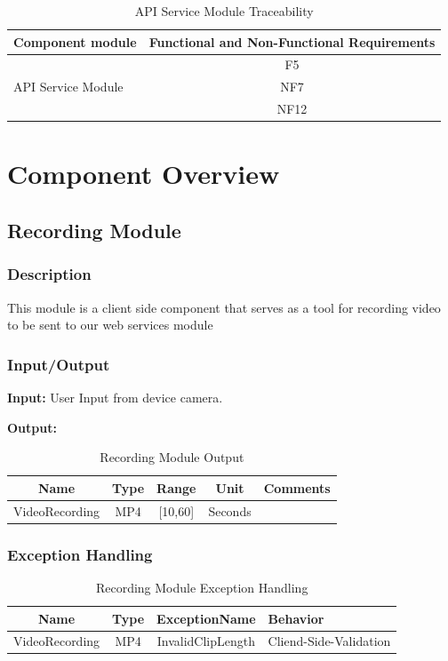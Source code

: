 \documentclass{article}
\begin{document}
\begin{table}[H]
    \caption{API Service Module Traceability}
    \centering
    \begin{tabular}{|l|c|} \hline
        \textbf{Component module} & \textbf{Functional and Non-Functional Requirements} \\ \hline
         \multirow{3}{*}{API Service Module} & F5 \\ \cline{2-2}
         & NF7 \\ \cline{2-2}
         & NF12 \\ \hline
    \end{tabular}
    \label{tab:API_Services_Module}
\end{table}


\section{Component Overview}

\subsection{Recording Module}
\subsubsection{Description}
This module is a client side component that serves as a tool for recording video to be sent to our web services module

\subsubsection{Input/Output}
\textbf{Input:} User Input from device camera.

\textbf{Output:}
\begin{table}[H]
    \caption{Recording Module Output}
    \centering
    \begin{tabularx}{0.7\textwidth}{|c|c|c|c|X|} \hline
        \textbf{Name} & \textbf{Type} & \textbf{Range} & \textbf{Unit} & \textbf{Comments} \\ \hline
        VideoRecording & MP4 & [10,60] & Seconds & \\ \hline
    \end{tabularx}
    \label{tab:Recording_Output}
\end{table}

\subsubsection{Exception Handling}
\begin{table}[H]
    \caption{Recording Module Exception Handling}
    \centering
    \begin{tabularx}{0.7\textwidth}{|c|c|c|X|} \hline
        \textbf{Name} & \textbf{Type} & \textbf{ExceptionName} & \textbf{Behavior} \\ \hline
        VideoRecording & MP4 & InvalidClipLength & Cliend-Side-Validation \\ \hline
    \end{tabularx}
    \label{tab:Recording_Exception}
\end{table}
\end{document}
